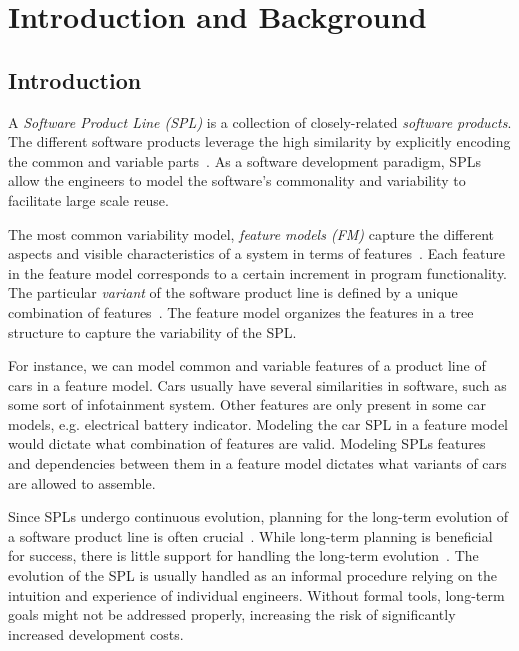 \documentclass[a4paper,english]{ifimaster}
\begin{document}
\tableofcontents{}
\listoffigures{}
\listoftables{}

\mainmatter{}

\part{Introduction and Background}%
\label{prt:introduction_and_background}

\chapter{Introduction}%
\label{cha:introduction}

A \textit{Software Product Line (SPL)} is a collection of closely-related \textit{software products}. The different software products leverage the high similarity by explicitly encoding the common and variable parts~\cite{cite:spl_practices_and_patterns, cite:spl_book}. As a software development paradigm, SPLs allow the engineers to model the software's commonality and variability to facilitate large scale reuse.

The most common variability model, \textit{feature models (FM)} capture the different aspects and visible characteristics of a system in terms of features~\cite{cite:software_diversity_ina}. Each feature in the feature model corresponds to a certain increment in program functionality. The particular \textit{variant} of the software product line is defined by a unique combination of features~\cite{cite:don_batory_fm_grammar_prop}. The feature model organizes the features in a tree structure to capture the variability of the SPL.

For instance, we can model common and variable features of a product line of cars in a feature model. Cars usually have several similarities in software, such as some sort of infotainment system. Other features are only present in some car models, e.g. electrical battery indicator. Modeling the car SPL in a feature model would dictate what combination of features are valid. Modeling SPLs features and dependencies between them in a feature model dictates what variants of cars are allowed to assemble.

Since SPLs undergo continuous evolution, planning for the long-term evolution of a software product line is often crucial~\cite{cite:product_line_evolution_reasoning}. While long-term planning is beneficial for success, there is little support for handling the long-term evolution~\cite{cite:evofm_fm_planning}. The evolution of the SPL is usually handled as an informal procedure relying on the intuition and experience of individual engineers. Without formal tools, long-term goals might not be addressed properly, increasing the risk of significantly increased development costs.
\end{document}
